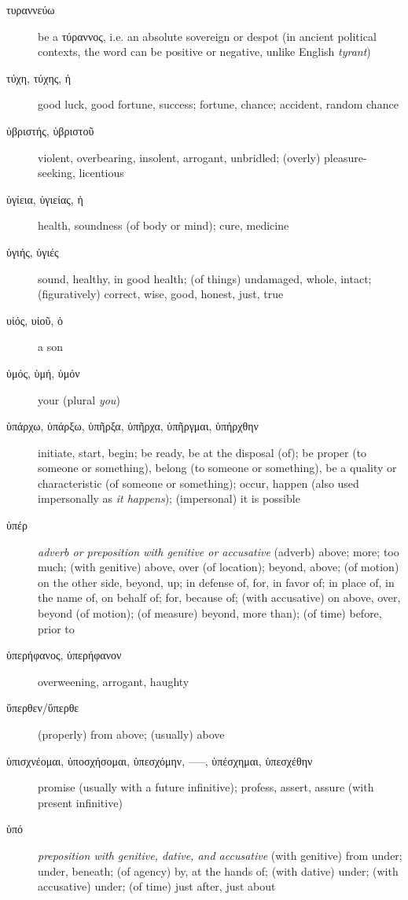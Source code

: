 \documentclass[12pt,letterpaper]{article}
\begin{document}
\begin{description}
    \item[\textgreek{τυραννεύω}] be a \textgreek{τύραννος}, i.e. an absolute sovereign or despot (in ancient political contexts, the word can be positive or negative, unlike English \textit{tyrant})
    \item[\textgreek{τύχη, τύχης, ἡ}] \marginnote{*}good luck, good fortune, success; fortune, chance; accident, random chance
    \item[\textgreek{ὑβριστής, ὑβριστοῦ}] violent, overbearing, insolent, arrogant, unbridled; (overly) pleasure-seeking, licentious
    \item[\textgreek{ὑγίεια, ὑγιείας, ἡ}] health, soundness (of body or mind); cure, medicine
    \item[\textgreek{ὑγιής, ὑγιές}] sound, healthy, in good health; (of things) undamaged, whole, intact; (figuratively) correct, wise, good, honest, just, true
    \item[\textgreek{υἱός, υἱοῦ, ὁ}] \marginnote{*}a son
    \item[\textgreek{ὑμός, ὑμή, ὑμόν}] your (plural \textit{you})
    \item[\textgreek{ὑπάρχω, ὑπάρξω, ὑπῆρξα, ὑπῆρχα, ὑπῆργμαι, ὑπήρχθην}] \marginnote{*}initiate, start, begin; be ready, be at the disposal (of); be proper (to someone or something), belong (to someone or something), be a quality or characteristic (of someone or something); occur, happen (also used impersonally as \textit{it happens}); (impersonal) it is possible
    \item[\textgreek{ὑπέρ}] \marginnote{*}\textit{adverb or preposition with genitive or accusative} (adverb) above; more; too much; (with genitive) above, over (of location); beyond, above; (of motion) on the other side, beyond, up; in defense of, for, in favor of; in place of, in the name of, on behalf of; for, because of; (with accusative) on above, over, beyond (of motion); (of measure) beyond, more than); (of time) before, prior to
    \item[\textgreek{ὑπερήφανος, ὑπερήφανον}] overweening, arrogant, haughty
    \item[\textgreek{ὕπερθεν/ὕπερθε}] (properly) from above; (usually) above
    \item[\textgreek{ὑπισχνέομαι, ὑποσχήσομαι, ὑπεσχόμην, –––, ὑπέσχημαι, ὑπεσχέθην}] promise (usually with a future infinitive); profess, assert, assure (with present infinitive)
    \item[\textgreek{ὑπό}] \marginnote{*}\textit{preposition with genitive, dative, and accusative} (with genitive) from under; under, beneath; (of agency) by, at the hands of; (with dative) under; (with accusative) under; (of time) just after, just about

\end{description}
\end{document}
